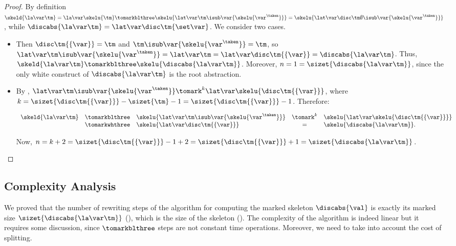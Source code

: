 \begin{proof}
By definition $\skeld{\la\var\tm} = \la\var\skelu{\tm} \tomarkblthree \skelu{\lat\var\tm\isub\var{\skelu{\var^\taken}} }= \skelu{\lat\var\disc\tm\emptyset\isub\var{\skelu{\var^\taken}}}$, while $\discabs{\la\var\tm} = \lat\var\disc\tm{\set\var}$.
We consider two cases.
\begin{itemize}
\item \case{$\var \notin \fv{\tm}$} Then $\disc\tm{\{\var\}} = \tm$ and $\tm\isub\var{\skelu{\var^\taken}} = \tm$, so $\lat\var\tm\isub\var{\skelu{\var^\taken}}=\lat\var\tm=\lat\var\disc\tm{\{\var\}}=\discabs{\la\var\tm}$. Thus, $\skeld{\la\var\tm} \tomarkblthree \skelu{\discabs{\la\var\tm}}$. Moreover, $n = 1 = \sizet{\discabs{\la\var\tm}}$, since the only white construct of $\discabs{\la\var\tm}$ is the root abstraction.

\item \case{$\var \in \fv{\tm}$}
By , $\lat\var\tm\isub\var{\skelu{\var^\taken}} \tomark^k \lat\var\skelu{\disc\tm{\{\var\}}}$, where $k = \sizet{\disc\tm{\{\var\}}} - \sizet{\tm} -1 = \sizet{\disc\tm{\{\var\}}}-1$.
Therefore:
\begin{center}
$\begin{array}{lclcll}
\skeld{\la\var\tm} & \tomarkblthree & \skelu{\lat\var\tm\isub\var{\skelu{\var^\taken}} }
%
& \tomark^{k} & 
\skelu{\lat\var\skelu{\disc\tm{\{\var\}}}}
\\
& \tomarkwhthree & 
\skelu{\lat\var\disc\tm{\{\var\}} }
& = & 
\skelu{\discabs{\la\var\tm}}.
\end{array}$
\end{center}
Now, $n = k + 2 = \sizet{\disc\tm{\{\var\}}} -1 +2 = \sizet{\disc\tm{\{\var\}}} +1= \sizet{\discabs{\la\var\tm}}$.\qedhere
\end{itemize}
\end{proof}


\subsection{Complexity Analysis} 
We proved that the number of rewriting steps of the algorithm for computing the marked skeleton $\discabs{\val}$ is exactly its marked size $\sizet{\discabs{\la\var\tm}}$ (), which is the size of the skeleton (). The complexity of the algorithm is indeed linear but it requires some discussion, since $\tomarkblthree$ steps are not constant time operations. Moreover, we need to take into account the cost of splitting.



